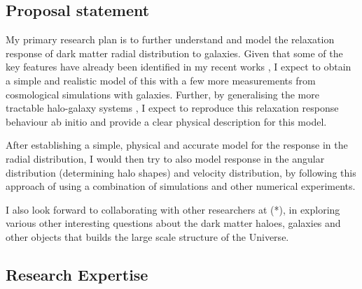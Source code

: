 \documentclass[11pt]{article}
\begin{document}
\subsection{Proposal statement}
My primary research plan is to further understand and model the relaxation response of dark matter radial distribution to galaxies. Given that some of the key features have already been identified in my recent works \cite{2023MNRAS.520.2867V,2024arXiv240708030V,2024arXiv240804864V}, I expect to obtain a simple and realistic model of this with a few more measurements from cosmological simulations with galaxies. Further, by generalising the more tractable halo-galaxy systems \cite{2024JCAP...05..080V}, I expect to reproduce this relaxation response behaviour ab initio and provide a clear physical description for this model. 



After establishing a simple, physical and accurate model for the response in the radial distribution, I would then try to also model response in the angular distribution (determining halo shapes) and velocity distribution, by following this approach of using a combination of simulations and other numerical experiments.

I also look forward to collaborating with other researchers at (*), in exploring various other interesting questions about the dark matter haloes, galaxies and other objects that builds the large scale structure of the Universe.


\subsection{Research Expertise}
\end{document}
